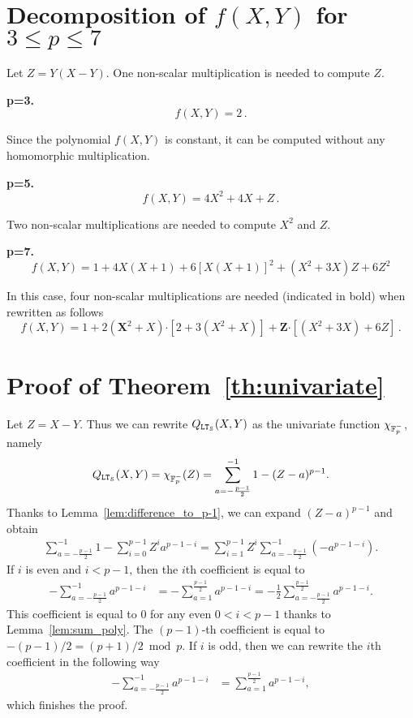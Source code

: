 \section{Decomposition of $f(X,Y)$ for $3\leq p \leq 7$}
\label{app:decomposition-f}
Let $Z = Y(X-Y)$. 
One non-scalar multiplication is needed to compute $Z$.

\textbf{p=3.}
$$f(X,Y) = 2\,.$$

Since the polynomial $f(X,Y)$ is constant, it can be computed without any homomorphic multiplication.

\textbf{p=5.}
$$f(X,Y) = 4X^2 + 4X + Z\,.$$

Two non-scalar multiplications are needed to compute $X^2$ and $Z$.

\textbf{p=7.}
$$f(X,Y) = 1 + 4X(X+1) + 6[X(X+1)]^2 + (X^2+3X)Z + 6Z^2$$

In this case, four non-scalar multiplications are needed (indicated in bold) when rewritten as follows
$$f(X,Y) = 1 + 2(\bm{X}^2+X)\bm{\cdot}[2 + 3(X^2+X)] + \bm{Z}\bm{\cdot}[(X^2+3X) + 6Z]\,.$$

\section{Proof of Theorem~\ref{th:univariate}}
\label{app:proof-lem-univariate}
   Let $Z = X-Y$.
    Thus we can rewrite $Q_{\mathtt{LT}_{\mathcal{S}}}(X,Y)$ as the univariate function $\chi_{\mathbb{F}_p^-}$, namely
    \begin{align*}
      Q_{\mathtt{LT}_{\mathcal{S}}}(X,Y) = \chi_{\mathbb{F}_p^-}(Z) = \sum_{a=-\frac{p-1}{2}}^{-1} 1 - (Z - a)^{p-1}.
    \end{align*}
    Thanks to Lemma~\ref{lem:difference_to_p-1}, we can expand $(Z-a)^{p-1}$ and obtain
    \begin{align*}
      \sum_{a=-\frac{p-1}{2}}^{-1} 1 - \sum_{i=0}^{p-1} Z^i a^{p-1-i}
      = \sum_{i=1}^{p-1} Z^i \sum_{a=-\frac{p-1}{2}}^{-1} (-a^{p-1-i}).
    \end{align*}
    If $i$ is even and $i < p-1$, then the $i$th coefficient is equal to
    \begin{align*}
      -\sum_{a=-\frac{p-1}{2}}^{-1} a^{p-1-i} &= -\sum_{a=1}^{\frac{p-1}{2}} a^{p-1-i} = -\frac{1}{2}\sum_{a=-\frac{p-1}{2}}^{\frac{p-1}{2}} a^{p-1-i}.
    \end{align*}
    This coefficient is equal to $0$ for any even $0<i < p-1$ thanks to Lemma~\ref{lem:sum_poly}.
    The $(p-1)$-th coefficient is equal to $-(p-1)/2 = (p+1)/2 \bmod p$.
    If $i$ is odd, then we can rewrite the $i$th coefficient in the following way
    \begin{align*}
      -\sum_{a=-\frac{p-1}{2}}^{-1} a^{p-1-i} &= \sum_{a=1}^{\frac{p-1}{2}} a^{p-1-i},
    \end{align*}
    which finishes the proof.
 

